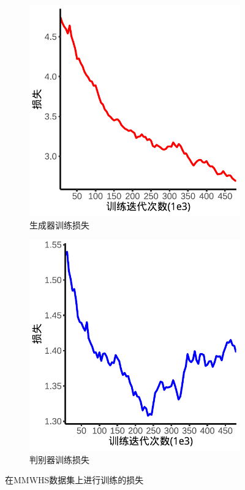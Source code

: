 \begin{figure}
    \centering
    \begin{subfigure}{0.45\textwidth}
        \includegraphics[width=\textwidth,height=\textwidth]{image/chap03/gen_loss.pdf}
        \caption{生成器训练损失}
        \label{fig:gen_loss}
    \end{subfigure}
    \hfill
    \begin{subfigure}{0.45\textwidth}
        \includegraphics[width=\textwidth,height=\textwidth]{image/chap03/dis_loss.pdf}
        \caption{判别器训练损失}
        \label{fig:dis_loss}
    \end{subfigure}
    \caption{在MMWHS数据集上进行训练的损失}
    \label{fig:loss}
    \end{figure}
